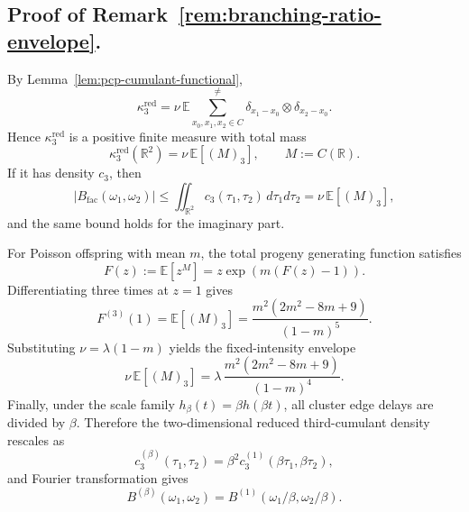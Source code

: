 \documentclass[aap,press]{apt} \volno{00} \partno{00}
\newcommand{\E}{\mathbb{E}}
\newcommand{\R}{\mathbb{R}}
\newcommand{\1}{\mathbf{1}}
\numberwithin{equation}{section}
\begin{document}
\subsection{Proof of Remark~\ref{rem:branching-ratio-envelope}.}
By Lemma~\ref{lem:pcp-cumulant-functional},
\[
\kappa_3^{\mathrm{red}}
=
\nu\,\E\sum_{x_0,x_1,x_2\in C}^{\neq}
\delta_{x_1-x_0}\otimes\delta_{x_2-x_0}.
\]
Hence $\kappa_3^{\mathrm{red}}$ is a positive finite measure with total mass
\[
\kappa_3^{\mathrm{red}}(\R^2)=\nu\,\E[(M)_3],
\qquad M:=C(\R).
\]
If it has density $c_3$, then
\[
|B_{\mathrm{fac}}(\omega_1,\omega_2)|
\le
\iint_{\R^2}c_3(\tau_1,\tau_2)\,d\tau_1d\tau_2
=
\nu\,\E[(M)_3],
\]
and the same bound holds for the imaginary part.

For Poisson offspring with mean $m$, the total progeny generating function satisfies
\[
F(z):=\E[z^M]=z\exp(m(F(z)-1)).
\]
Differentiating three times at $z=1$ gives
\[
F^{(3)}(1)=\E[(M)_3]
=
\frac{m^2(2m^2-8m+9)}{(1-m)^5}.
\]
Substituting $\nu=\lambda(1-m)$ yields the fixed-intensity envelope
\[
\nu\,\E[(M)_3]
=
\lambda\,\frac{m^2(2m^2-8m+9)}{(1-m)^4}.
\]
Finally, under the scale family $h_\beta(t)=\beta h(\beta t)$, all cluster edge delays are divided by $\beta$. Therefore the two-dimensional reduced third-cumulant density rescales as
\[
c_3^{(\beta)}(\tau_1,\tau_2)
=\beta^2c_3^{(1)}(\beta\tau_1,\beta\tau_2),
\]
and Fourier transformation gives
\[
B^{(\beta)}(\omega_1,\omega_2)
=B^{(1)}(\omega_1/\beta,\omega_2/\beta).
\]
\end{document}
